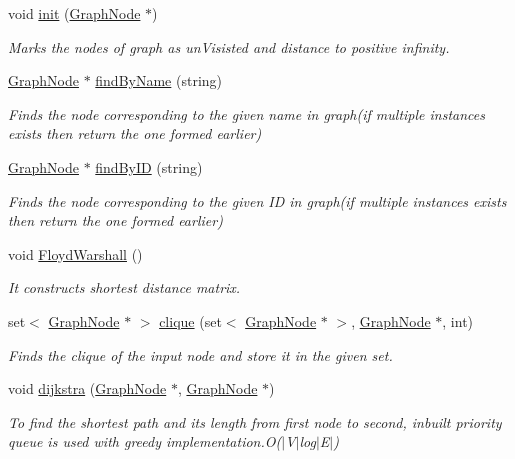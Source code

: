 \begin{DoxyCompactItemize}
void \hyperlink{classAlgorithms_af0154806d5c01828df47d898cfa87d51}{init} (\hyperlink{structGraphNode}{\-Graph\-Node} $\ast$)
\begin{DoxyCompactList}\small\item\em \-Marks the nodes of graph as un\-Visisted and distance to positive infinity. \end{DoxyCompactList}\item 
\hyperlink{structGraphNode}{\-Graph\-Node} $\ast$ \hyperlink{classAlgorithms_adb4d1a40501cccbaea49a2dfbd836581}{find\-By\-Name} (string)
\begin{DoxyCompactList}\small\item\em \-Finds the node corresponding to the given name in graph(if multiple instances exists then return the one formed earlier) \end{DoxyCompactList}\item 
\hyperlink{structGraphNode}{\-Graph\-Node} $\ast$ \hyperlink{classAlgorithms_ae9b36b1236b546fe3d5d6f32737acde9}{find\-By\-I\-D} (string)
\begin{DoxyCompactList}\small\item\em \-Finds the node corresponding to the given \-I\-D in graph(if multiple instances exists then return the one formed earlier) \end{DoxyCompactList}\item 
void \hyperlink{classAlgorithms_a7b0d9faca96eb10bd86a023ded0d1d58}{\-Floyd\-Warshall} ()
\begin{DoxyCompactList}\small\item\em \-It constructs shortest distance matrix. \end{DoxyCompactList}\item 
set$<$ \hyperlink{structGraphNode}{\-Graph\-Node} $\ast$ $>$ \hyperlink{classAlgorithms_a0539a806914c01b39f509b62d6f09eb5}{clique} (set$<$ \hyperlink{structGraphNode}{\-Graph\-Node} $\ast$ $>$, \hyperlink{structGraphNode}{\-Graph\-Node} $\ast$, int)
\begin{DoxyCompactList}\small\item\em \-Finds the clique of the input node and store it in the given set. \end{DoxyCompactList}\item 
void \hyperlink{classAlgorithms_a1cd00ff4730254ce7c7907ad0dbd8c91}{dijkstra} (\hyperlink{structGraphNode}{\-Graph\-Node} $\ast$, \hyperlink{structGraphNode}{\-Graph\-Node} $\ast$)
\begin{DoxyCompactList}\small\item\em \-To find the shortest path and its length from first node to second, inbuilt priority queue is used with greedy implementation.\-O($|$\-V$|$log$|$\-E$|$) \end{DoxyCompactList}\end{DoxyCompactItemize}


